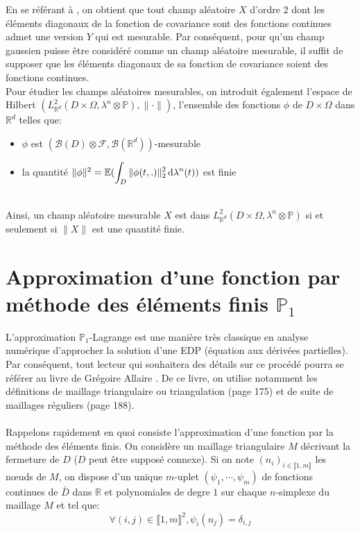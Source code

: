 En se référant à \cite{ScheuererMichael2010Rots}, on obtient que tout champ aléatoire $X$ d'ordre 2 dont
les éléments diagonaux de la fonction de covariance sont des fonctions continues
admet une version $Y$ qui est mesurable. Par conséquent, pour qu'un champ
gaussien puisse être considéré comme un champ aléatoire mesurable, il suffit de
supposer que les éléments diagonaux de sa fonction de covariance soient des
fonctions continues.
~\\

Pour étudier les champs aléatoires mesurables, on introduit également l'espace de Hilbert
$(L^2_{\mathbb{R}^d}(D \times \Omega, \lambda^n \otimes \mathbb{P}),\|\cdot\|)$,  l'ensemble des fonctions $\phi$ de $D \times \Omega$ dans
$\mathbb{R}^d$ telles que:
~\\
\begin{itemize}
\item $\phi$ est $(\mathcal{B}(D) \otimes \mathcal{F},\mathcal{B}(\mathbb{R}^d))$-mesurable
\item la quantité
$\|\phi\|^2 = \mathbb{E}(\displaystyle\int_D \|\phi(t,.)\|_2^2 \,\mathrm{d} \lambda^n(t))$ est finie
\end{itemize}
~\\
\noindent Ainsi, un champ aléatoire mesurable $X$ est dans
$L^2_{\mathbb{R}^d}(D \times \Omega , \lambda^n \otimes \mathbb{P}) $ si et seulement si $\|X\|$ est une quantité finie.


\section{Approximation d'une fonction par méthode des éléments finis $\mathbb{P}_1$}

L'approximation $\mathbb{P}_1$-Lagrange est une manière très classique en analyse numérique d'approcher la
solution d'une EDP (équation aux dérivées partielles). Par conséquent, tout lecteur qui souhaitera des détails
sur ce procédé pourra se référer au livre de Grégoire Allaire \cite{alma991003727179806616}. De ce livre, on utilise
notamment les définitions de maillage triangulaire ou triangulation (page 175) et de suite de maillages réguliers (page 188).\\
~\\
Rappelons rapidement en quoi consiste l'approximation d'une fonction par la méthode des éléments finis.
On considère un maillage triangulaire $M$ décrivant la fermeture de $D$ ($D$ peut être supposé connexe). Si on note $(n_i)_{i \in \llbracket 1,m \rrbracket}$  les n\oe uds de $M$, on dispose
d'un unique $m$-uplet $(\psi_1, \cdots, \psi_m)$ de fonctions continues de $\bar{D}$ dans $\mathbb{R}$ et polynomiales de degre $1$ sur
chaque $n$-simplexe du maillage $M$ et tel que:
\begin{equation*}
  \forall (i,j) \in \llbracket 1,m \rrbracket^2, \psi_i(n_j) = \delta_{i,j}
\end{equation*}

